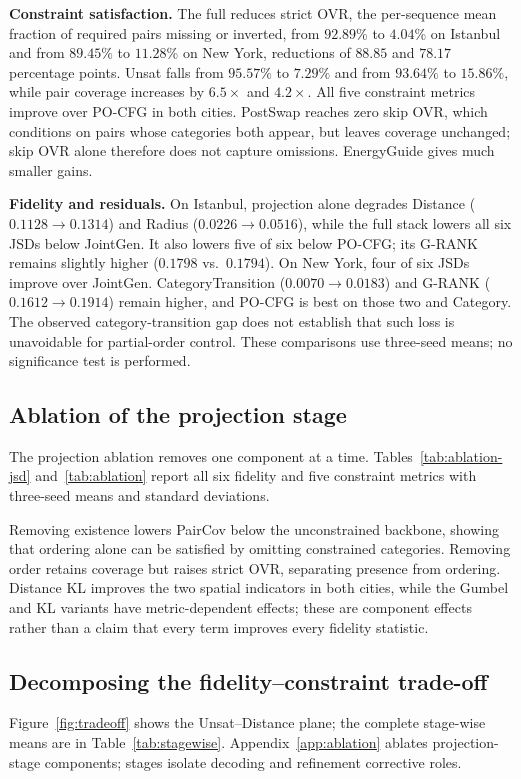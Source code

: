 \noindent\textbf{Constraint satisfaction.}
The full \pcdg reduces strict OVR, the per-sequence mean fraction of required
pairs missing or inverted, from $92.89\%$ to $4.04\%$ on Istanbul and
from $89.45\%$ to $11.28\%$ on New York, reductions of $88.85$ and $78.17$
percentage points. Unsat falls from $95.57\%$ to $7.29\%$ and from $93.64\%$
to $15.86\%$, while pair coverage increases by $6.5\times$ and $4.2\times$.
All five constraint metrics improve over PO-CFG in both cities.
PostSwap reaches zero skip OVR, which conditions on pairs whose categories
both appear, but leaves coverage unchanged; skip OVR alone therefore does not
capture omissions. EnergyGuide gives much smaller gains.

\noindent\textbf{Fidelity and residuals.}
On Istanbul, projection alone degrades Distance ($0.1128\to0.1314$) and Radius
($0.0226\to0.0516$), while the full stack lowers all six JSDs below JointGen.
It also lowers five of six below PO-CFG; its G-RANK remains slightly higher
($0.1798$ vs.\ $0.1794$). On New York, four of six JSDs improve over JointGen.
CategoryTransition ($0.0070\to0.0183$) and G-RANK ($0.1612\to0.1914$) remain
higher, and PO-CFG is best on those two and Category.
The observed category-transition gap does not establish that such loss is
unavoidable for partial-order control. These comparisons use three-seed means;
no significance test is performed.

\subsection{Ablation of the projection stage}
\label{sec:exp:ablation}
The projection ablation removes one component at a time. Tables~\ref{tab:ablation-jsd}
and~\ref{tab:ablation} report all six fidelity and five constraint metrics with
three-seed means and standard deviations.

Removing existence lowers PairCov below the unconstrained backbone, showing
that ordering alone can be satisfied by omitting constrained categories.
Removing order retains coverage but raises strict OVR, separating presence from
ordering. Distance KL improves the two spatial indicators in both cities, while
the Gumbel and KL variants have metric-dependent effects; these are component
effects rather than a claim that every term improves every fidelity statistic.

\subsection{Decomposing the fidelity--constraint trade-off}
\label{sec:exp:tradeoff}
Figure~\ref{fig:tradeoff} shows the Unsat--Distance plane; the complete stage-wise
means are in Table~\ref{tab:stagewise}. Appendix~\ref{app:ablation} ablates
projection-stage components; stages isolate decoding and refinement corrective roles.
